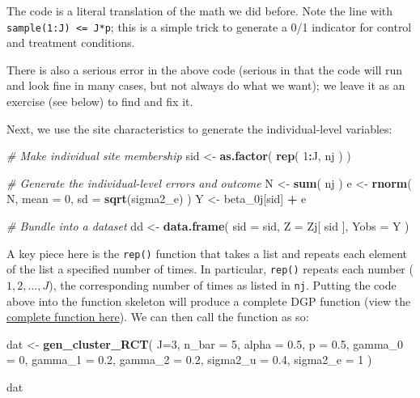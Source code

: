 \documentclass[
]{book}
\newenvironment{Shaded}{\begin{snugshade}}{\end{snugshade}}
\newcommand{\AttributeTok}[1]{\textcolor[rgb]{0.13,0.29,0.53}{#1}}
\newcommand{\CommentTok}[1]{\textcolor[rgb]{0.56,0.35,0.01}{\textit{#1}}}
\newcommand{\DecValTok}[1]{\textcolor[rgb]{0.00,0.00,0.81}{#1}}
\newcommand{\FloatTok}[1]{\textcolor[rgb]{0.00,0.00,0.81}{#1}}
\newcommand{\FunctionTok}[1]{\textcolor[rgb]{0.13,0.29,0.53}{\textbf{#1}}}
\newcommand{\NormalTok}[1]{#1}
\newcommand{\OtherTok}[1]{\textcolor[rgb]{0.56,0.35,0.01}{#1}}
\newcommand{\SpecialCharTok}[1]{\textcolor[rgb]{0.81,0.36,0.00}{\textbf{#1}}}
\begin{document}
The code is a literal translation of the math we did before.
Note the line with \texttt{sample(1:J)\ \textless{}=\ J*p}; this is a simple trick to generate a 0/1 indicator for control and treatment conditions.

There is also a serious error in the above code (serious in that the code will run and look fine in many cases, but not always do what we want); we leave it as an exercise (see below) to find and fix it.

Next, we use the site characteristics to generate the individual-level variables:

\begin{Shaded}
\begin{Highlighting}[]
  \CommentTok{\# Make individual site membership}
\NormalTok{  sid }\OtherTok{\textless{}{-}} \FunctionTok{as.factor}\NormalTok{( }\FunctionTok{rep}\NormalTok{( }\DecValTok{1}\SpecialCharTok{:}\NormalTok{J, nj ) )}
  
  \CommentTok{\# Generate the individual{-}level errors and outcome}
\NormalTok{  N }\OtherTok{\textless{}{-}} \FunctionTok{sum}\NormalTok{( nj )}
\NormalTok{  e }\OtherTok{\textless{}{-}} \FunctionTok{rnorm}\NormalTok{( N, }\AttributeTok{mean =} \DecValTok{0}\NormalTok{, }\AttributeTok{sd =} \FunctionTok{sqrt}\NormalTok{(sigma2\_e) )}
\NormalTok{  Y }\OtherTok{\textless{}{-}}\NormalTok{ beta\_0j[sid] }\SpecialCharTok{+}\NormalTok{ e}
  
  \CommentTok{\# Bundle into a dataset}
\NormalTok{  dd }\OtherTok{\textless{}{-}} \FunctionTok{data.frame}\NormalTok{( }
    \AttributeTok{sid =}\NormalTok{ sid,}
    \AttributeTok{Z =}\NormalTok{ Zj[ sid ],}
    \AttributeTok{Yobs =}\NormalTok{ Y}
\NormalTok{  )}
\end{Highlighting}
\end{Shaded}

A key piece here is the \texttt{rep()} function that takes a list and repeats each element of the list a specified number of times.
In particular, \texttt{rep()} repeats each number (\(1, 2, \ldots, J\)), the corresponding number of times as listed in \texttt{nj}.
Putting the code above into the function skeleton will produce a complete DGP function (view the \href{/case_study_code/gen_cluster_RCT.R}{complete function here}).
We can then call the function as so:

\begin{Shaded}
\begin{Highlighting}[]
\NormalTok{dat }\OtherTok{\textless{}{-}} \FunctionTok{gen\_cluster\_RCT}\NormalTok{( }
  \AttributeTok{J=}\DecValTok{3}\NormalTok{, }\AttributeTok{n\_bar =} \DecValTok{5}\NormalTok{, }\AttributeTok{alpha =} \FloatTok{0.5}\NormalTok{, }\AttributeTok{p =} \FloatTok{0.5}\NormalTok{, }
  \AttributeTok{gamma\_0 =} \DecValTok{0}\NormalTok{, }\AttributeTok{gamma\_1 =} \FloatTok{0.2}\NormalTok{, }\AttributeTok{gamma\_2 =} \FloatTok{0.2}\NormalTok{,}
  \AttributeTok{sigma2\_u =} \FloatTok{0.4}\NormalTok{, }\AttributeTok{sigma2\_e =} \DecValTok{1}
\NormalTok{)}

\NormalTok{dat}
\end{Highlighting}
\end{Shaded}
\end{document}
